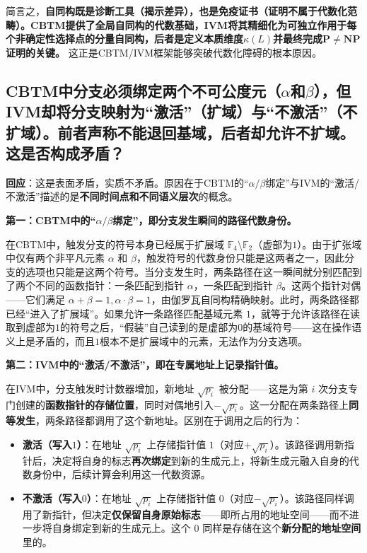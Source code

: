 \documentclass{ctexart}
\begin{document}
	简言之，\textbf{自同构既是诊断工具（揭示差异），也是免疫证书（证明不属于代数化范畴）。CBTM提供了全局自同构的代数基础，IVM将其精细化为可独立作用于每个非确定性选择点的分量自同构，后者是定义本质维度$\kappa(L)$并最终完成$\mathbf{P}\neq\mathbf{NP}$证明的关键。} 这正是CBTM/IVM框架能够突破代数化障碍的根本原因。
	
	
	\subsection{CBTM中分支必须绑定两个不可公度元（$\alpha$和$\beta$），但IVM却将分支映射为``激活''（扩域）与``不激活''（不扩域）。前者声称不能退回基域，后者却允许不扩域。这是否构成矛盾？}
	
	\textbf{回应}：这是表面矛盾，实质不矛盾。原因在于CBTM的``$\alpha/\beta$绑定''与IVM的``激活/不激活''描述的是\textbf{不同时间点和不同语义层次}的概念。
	
	\textbf{第一：CBTM中的``$\alpha/\beta$绑定''，即分支发生瞬间的路径代数身份。}
	
	在CBTM中，触发分支的符号本身已经属于扩展域 $\mathbb{F}_4 \setminus \mathbb{F}_2$（虚部为$1$）。由于扩张域中仅有两个非平凡元素 $\alpha$ 和 $\beta$，触发符号的代数身份只能是这两者之一，因此分支的选项也只能是这两个符号。当分支发生时，两条路径在这一瞬间就分别匹配到了两个不同的函数指针：一条匹配到指针 $\alpha$，一条匹配到指针 $\beta$。这两个指针对偶——它们满足 $\alpha + \beta = 1, \alpha \cdot \beta = 1$，由伽罗瓦自同构精确映射。此时，两条路径都已经``进入了扩展域''。如果允许一条路径匹配基域元素 $1$，就等于允许该路径在读取到虚部为$1$的符号之后，``假装''自己读到的是虚部为$0$的基域符号——这在操作语义上是矛盾的，而且$1$根本不是扩展域中的元素，无法作为分支选项。
	
	\textbf{第二：IVM中的``激活/不激活''，即在专属地址上记录指针值。}
	
	在IVM中，分支触发时计数器增加，新地址 $\sqrt{p_i}$ 被分配——这是为第 $i$ 次分支专门创建的\textbf{函数指针的存储位置}，同时对偶地引入$-\sqrt{p_i}$。这一分配在两条路径上\textbf{同等发生}，两条路径都调用了这个新地址。区别在于调用之后的行为：
	
	\begin{itemize}
		\item \textbf{激活（写入$1$）}：在地址 $\sqrt{p_i}$ 上存储指针值 $1$（对应$+\sqrt{p_i}$）。该路径调用新指针后，决定将自身的标志\textbf{再次绑定}到新的生成元上，将新生成元融入自身的代数身份中，后续计算会利用这一代数资源。
		\item \textbf{不激活（写入$0$）}：在地址 $\sqrt{p_i}$ 上存储指针值 $0$（对应$-\sqrt{p_i}$）。该路径同样调用了新指针，但决定\textbf{仅保留自身原始标志}——即所占用的地址空间——而不进一步将自身绑定到新的生成元上。这个 $0$ 同样是存储在这个\textbf{新分配的地址空间}里的。
	\end{itemize}
	
\end{document}

